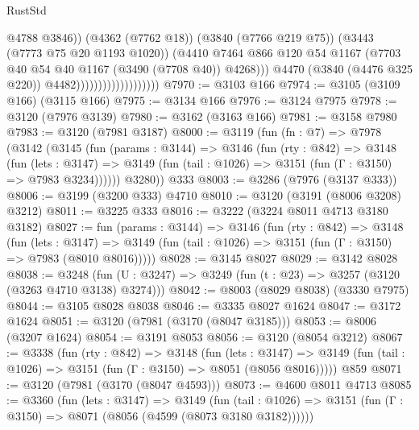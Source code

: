 \begin{lexlean}{RustStd}
\begin{coremodule}
                                                @4788
                                                @3846))
                                            (@4362 (@7762 @18))
                                            (@3840 (@7766 @219 @75))
                                            (@3443 (@7773 @75 @20 @1193 @1020))
                                            (@4410
                                              @7464
                                              @866
                                              @120
                                              @54
                                              @1167
                                              (@7703 @40 @54 @40 @1167 (@3490 (@7708 @40)) @4268)))
                                          @4470
                                          (@3840 (@4476 @325 @220))
                                          @4482)))))))))))))))))))
@7970 := @3103 @166
@7974 := @3105 (@3109 @166) (@3115 @166)
@7975 := @3134 @166
@7976 := @3124 @7975
@7978 := @3120 (@7976 @3139)
@7980 := @3162 (@3163 @166)
@7981 := @3158 @7980
@7983 := @3120 (@7981 @3187)
@8000 := @3119
    (fun (fn : @7) =>
    @7978
      (@3142
        (@3145
          (fun (params : @3144) =>
          @3146
            (fun (rty : @842) =>
            @3148
              (fun (lets : @3147) =>
              @3149 (fun (tail : @1026) => @3151 (fun (Γ : @3150) => @7983 @3234))))))
        @3280))
    @333
@8003 := @3286 (@7976 (@3137 @333))
@8006 := @3199 (@3200 @333) @4710
@8010 := @3120 (@3191 (@8006 @3208) @3212)
@8011 := @3225 @333
@8016 := @3222 (@3224 @8011 @4713 @3180 @3182)
@8027 := fun (params : @3144) =>
  @3146
    (fun (rty : @842) =>
    @3148
      (fun (lets : @3147) =>
      @3149 (fun (tail : @1026) => @3151 (fun (Γ : @3150) => @7983 (@8010 @8016)))))
@8028 := @3145 @8027
@8029 := @3142 @8028
@8038 := @3248 (fun (U : @3247) => @3249 (fun (t : @23) => @3257 (@3120 (@3263 @4710 @3138) @3274)))
@8042 := @8003 (@8029 @8038) (@3330 @7975)
@8044 := @3105 @8028 @8038
@8046 := @3335 @8027 @1624
@8047 := @3172 @1624
@8051 := @3120 (@7981 (@3170 (@8047 @3185)))
@8053 := @8006 (@3207 @1624)
@8054 := @3191 @8053
@8056 := @3120 (@8054 @3212)
@8067 := @3338
    (fun (rty : @842) =>
    @3148
      (fun (lets : @3147) =>
      @3149 (fun (tail : @1026) => @3151 (fun (Γ : @3150) => @8051 (@8056 @8016)))))
    @859
@8071 := @3120 (@7981 (@3170 (@8047 @4593)))
@8073 := @4600 @8011 @4713
@8085 := @3360
    (fun (lets : @3147) =>
    @3149
      (fun (tail : @1026) => @3151 (fun (Γ : @3150) => @8071 (@8056 (@4599 (@8073 @3180 @3182))))))

\end{coremodule}
\end{lexlean}
